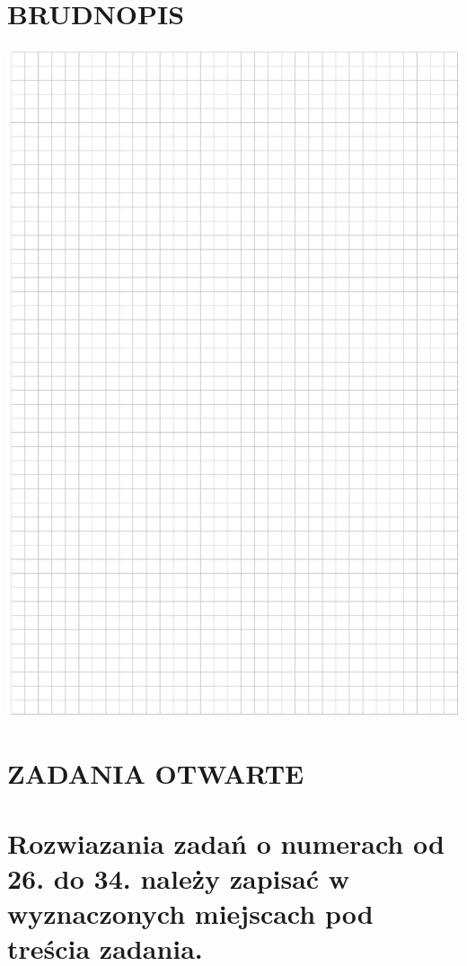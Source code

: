 \documentclass[10pt]{article}
\begin{document}
\section*{BRUDNOPIS}
\begin{center}
\includegraphics[max width=\textwidth]{2024_11_21_6a8be49478f78d0689cfg-09}
\end{center}

\section*{ZADANIA OTWARTE}
\section*{Rozwiazania zadań o numerach od 26. do 34. należy zapisać w wyznaczonych miejscach pod treścia zadania.}
\end{document}
